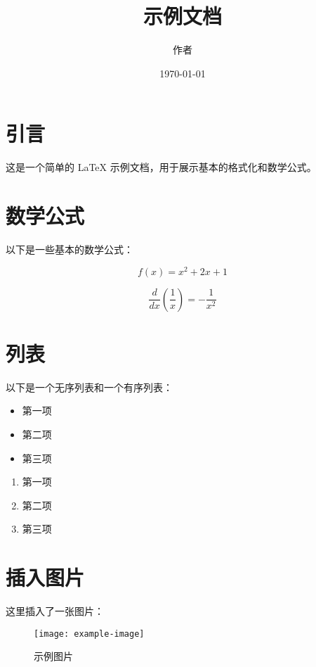 \documentclass{article}
\title{示例文档}
\author{作者}
\date{\today}
\begin{document}
\maketitle

\section{引言}

这是一个简单的 LaTeX 示例文档，用于展示基本的格式化和数学公式。

\section{数学公式}

以下是一些基本的数学公式：

\begin{equation}
  f(x) = x^2 + 2x + 1
\end{equation}

\begin{equation}
  \frac{d}{dx} \left( \frac{1}{x} \right) = -\frac{1}{x^2}
\end{equation}

\section{列表}

以下是一个无序列表和一个有序列表：

\begin{itemize}
  \item 第一项
  \item 第二项
  \item 第三项
\end{itemize}

\begin{enumerate}
  \item 第一项
  \item 第二项
  \item 第三项
\end{enumerate}

\section{插入图片}

这里插入了一张图片：

\begin{figure}[htbp]
  \centering
  \texttt{[image: example-image]}
  \caption{示例图片}
  \label{fig:example}
\end{figure}
\end{document}
